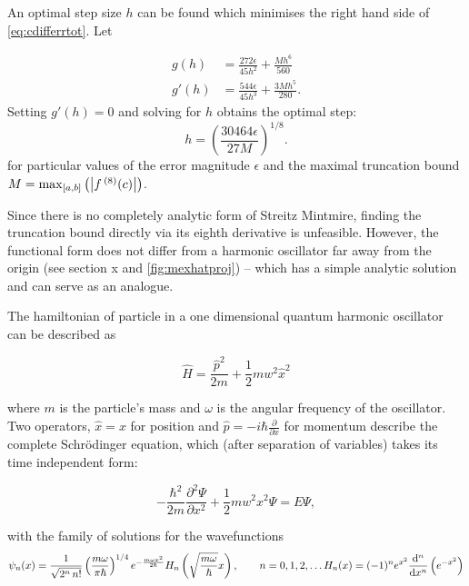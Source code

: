 An optimal step size $h$ can be found which minimises the right hand side of \cref{eq:cdifferrtot}. Let

\begin{align}
g(h) &= \frac{272\epsilon}{45h^2}+\frac{Mh^6}{560}\\[0.2cm]
g'(h) &= \frac{544\epsilon}{45h^3}+\frac{3Mh^5}{280}.
\end{align}
Setting $g'(h) = 0$ and solving for $h$ obtains the optimal step:
\begin{equation}
h = \left(\frac{30464\epsilon}{27M}\right)^{1/8}.
\end{equation}
for particular values of the error magnitude $\epsilon$ and the maximal truncation bound $M = \mathrm{max}_{[a,b]}\left(\left\lvert f\,^{(8)}(c)\right\rvert\right)$.

Since there is no completely analytic form of Streitz Mintmire, finding the truncation bound directly via its eighth derivative is unfeasible. However, the functional form does not differ from a harmonic oscillator far away from the origin (see section x and \cref{fig:mexhatproj}) -- which has a simple analytic solution and can serve as an analogue.

The hamiltonian of particle in a one dimensional quantum harmonic oscillator can be described as

\begin{equation}
\widehat{H} = \frac{\widehat{p}^2}{2m}+\frac{1}{2}mw^2\widehat{x}^2
\end{equation}

where $m$ is the particle's mass and $ω$ is the angular frequency of the oscillator. Two operators, $\widehat{x} = x$ for position and $\widehat{p} = -i\hbar \frac{\partial}{\partial x}$ for momentum describe the complete Schr\"{o}dinger equation, which (after separation of variables) takes its time independent form:

\begin{equation}
-\frac{\hbar^2}{2m}\frac{\partial^2 \Psi}{\partial x^2}+\frac{1}{2}mw^2x^2 \Psi = E\Psi,
\end{equation}

with the family of solutions for the wavefunctions
\begin{equation}\psi_n(x) = \frac{1}{\sqrt{2^n\,n!}}\left(\frac{m\omega}{\pi \hbar}\right)^{1/4}e^{
- \frac{m\omega x^2}{2 \hbar}} H_n\left(\sqrt{\frac{m\omega}{\hbar}} x \right),\qquad n = 0,1,2,\ldots\\
H_n(x)=(-1)^n e^{x^2}\frac{\mathrm{d}^n}{\mathrm{d}x^n}\left(e^{-x^2}\right)
\end{equation}

